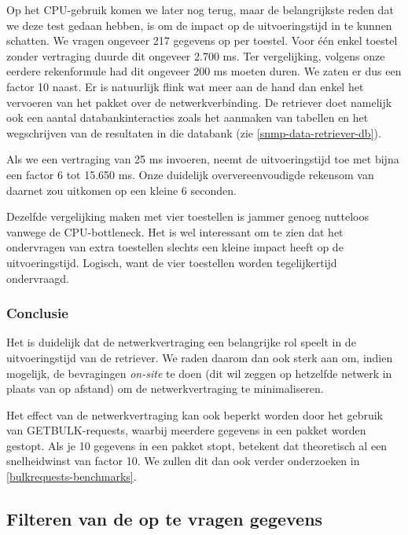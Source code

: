 Op het CPU-gebruik komen we later nog terug, maar de belangrijkste reden dat we deze test gedaan hebben, is om de impact op de uitvoeringstijd in te kunnen schatten.
We vragen ongeveer 217 gegevens op per toestel.
Voor één enkel toestel zonder vertraging duurde dit ongeveer 2.700 ms.
Ter vergelijking, volgens onze eerdere rekenformule had dit ongeveer 200 ms moeten duren.
We zaten er dus een factor 10 naast.
Er is natuurlijk flink wat meer aan de hand dan enkel het vervoeren van het pakket over de netwerkverbinding.
De retriever doet namelijk ook een aantal databankinteracties zoals het aanmaken van tabellen en
het wegschrijven van de resultaten in die databank (zie \cref{snmp-data-retriever-db}).

Als we een vertraging van 25 ms invoeren, neemt de uitvoeringstijd toe met bijna een factor 6 tot 15.650 ms.
Onze duidelijk oververeenvoudigde rekensom van daarnet zou uitkomen op een kleine 6 seconden.

Dezelfde vergelijking maken met vier toestellen is jammer genoeg nutteloos vanwege de CPU-bottleneck.
Het is wel interessant om te zien dat het ondervragen van extra toestellen slechts een kleine impact heeft op de uitvoeringstijd.
Logisch, want de vier toestellen worden tegelijkertijd ondervraagd.


\subsubsection{Conclusie}

Het is duidelijk dat de netwerkvertraging een belangrijke rol speelt in de uitvoeringstijd van de retriever.
We raden daarom dan ook sterk aan om, indien mogelijk, de bevragingen \textit{on-site} te doen
(dit wil zeggen op hetzelfde netwerk in plaats van op afstand) om de netwerkvertraging te minimaliseren.

Het effect van de netwerkvertraging kan ook beperkt worden door het gebruik van GETBULK-requests,
waarbij meerdere gegevens in een pakket worden gestopt.
Als je 10 gegevens in een pakket stopt, betekent dat theoretisch al een snelheidwinst van factor 10.
We zullen dit dan ook verder onderzoeken in \cref{bulkrequests-benchmarks}.




\subsection{Filteren van de op te vragen gegevens}
\label{fracties}

